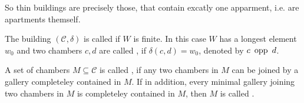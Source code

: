 So thin buildings are precisely those, that contain excatly one apparment, i.e. are apartments themself.

\begin{defi}
	The building $(\mathcal{C},\delta)$ is called  if $W$ is finite. In this case $W$ has a longest element $w_0$ and two chambers $c,d$ are called , if $\delta(c,d) = w_0$, denoted by $c \opp d$.
\end{defi}

\begin{defi}
	A set of chambers $M \subseteq \mathcal{C}$ is called , if any two chambers in $M$ can be joined by a gallery completeley contained in $M$. If in addition, every minimal gallery joining two chambers in $M$ is completeley contained in $M$, then $M$ is called .
\end{defi}